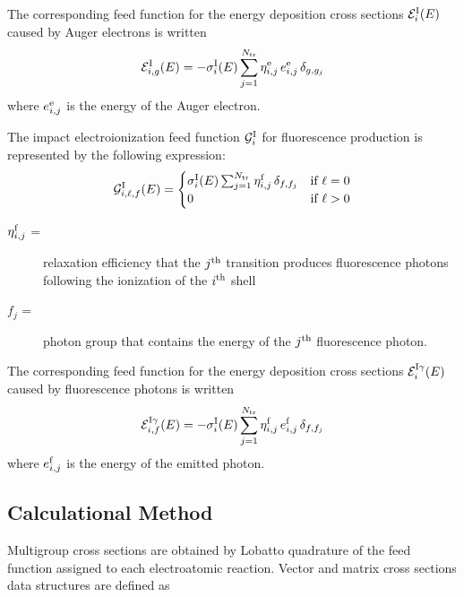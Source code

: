 The corresponding feed function for the energy deposition cross sections
${\cal E}_i^{\rm I}(E)$ caused by Auger electrons is written
  \begin{equation}
    {\cal E}^{\rm I}_{i,g}(E) =
    -\sigma^{\rm I}_i(E) \sum_{j=1}^{N_{\rm tr}} \eta_{i,j}^{\rm e} \,
    e_{i,j}^{\rm e} \,\delta_{g,g_j}
  \label{elr_eq26}
  \end{equation}
\noindent where $e_{i,j}^{\rm e}$ is the energy of the Auger electron.

The {impact electroionization feed function} ${\cal G}^{\rm I}_i$
 for fluorescence production is represented by
the following expression:
  \begin{equation}
    {\cal G}^{\rm I}_{i,\ell,f}(E) =  \begin{cases}
    \sigma^{\rm I}_i(E) \sum_{j=1}^{N_{\rm tr}} \eta_{i,j}^{\rm f} \,
    \delta_{f,f_j} & \text{if $\ell=0$} \\
    0 & \text{if $\ell>0$} \end{cases}
  \label{elr_eq27}
  \end{equation}
\begin{description}
\item [$\eta_{i,j}^{\rm f}$ =] relaxation efficiency that the $j^{\rm th}$
transition produces fluorescence photons following the ionization of the
$i^{\rm th}$ shell
\item [$f_j$ =] photon group that contains the energy of the
$j^{\rm th}$ fluorescence photon.
\end{description}

The corresponding feed function for the energy deposition cross sections
${\cal E}_i^{{\rm I}\gamma}(E)$ caused by fluorescence photons is written
  \begin{equation}
    {\cal E}^{{\rm I}\gamma}_{i,f}(E) =
    -\sigma^{\rm I}_i(E) \sum_{j=1}^{N_{\rm tr}} \eta_{i,j}^{\rm f} \,
    e_{i,j}^{\rm f} \,\delta_{f,f_j}
  \label{elr_eq28}
  \end{equation}
\noindent where $e_{i,j}^{\rm f}$ is the energy of the emitted photon.

\subsection{Calculational Method}
\label{ssELECTR_CalcMethod}

Multigroup cross sections are obtained by Lobatto quadrature of the feed
function assigned to each electroatomic reaction. Vector and matrix cross
sections data structures are defined as


